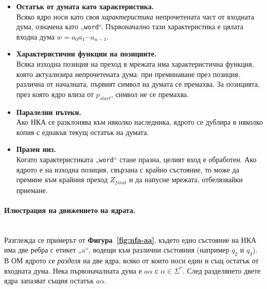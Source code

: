 \begin{itemize}
    \item \textbf{Остатък от думата като характеристика.}\\ Всяко ядро носи като своя \emph{характеристика} непрочетената част от входната дума, означена като „\texttt{word}“. Първоначално тази характеристика е цялата входна дума \( w = a_0 a_1 \cdots a_{n-1} \).

    \item \textbf{Характеристични функции на позициите.}\\ Всяка изходна позиция на преход в мрежата има характеристична функция, която актуализира непрочетената дума: при преминаване през позиция, различна от началната, първият символ на думата се премахва. За позицията, през която ядро влиза от $p_{start}$, символ не се премахва.

    \item \textbf{Паралелни пътеки.}\\  Ако НКА се разклонява към няколко наследника, ядрото се дублира в няколко копия с еднакъв текущ остатък на думата.

    \item \textbf{Празен низ.}\\ Когато характеристиката „\texttt{word}“ стане празна, целият вход е обработен. Ако ядрото е на изходна позиция, свързана с крайно състояние, то може да премине към крайния преход \( Z_{\mathit{final}} \) и да напусне мрежата, отбелязвайки приемане.
\end{itemize}

\paragraph*{Илюстрация на движението на ядрата.}
\mbox{}\\
Разглежда се примерът от \textbf{Фигура~\ref{fig:nfa-aa}}, където едно състояние на НКА има две ребра с етикет „a“, водещи към различни състояния (например \(q_2\) и \(q_3\)).  
В ОМ ядрото се \emph{разделя} на две ядра, всяко от които носи един и същ остатък от входната дума.  
Нека първоначалната дума е \(a\alpha\) с \(\alpha \in \Sigma^*\). След разделянето двете ядра запазват същия остатък \(a\alpha\).


